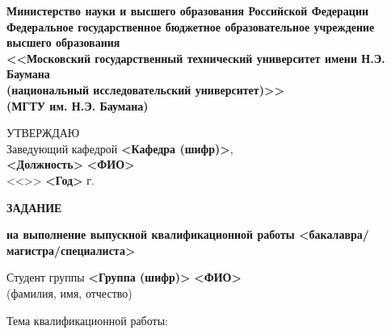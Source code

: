 \documentclass[utf8x, 14pt, oneside, a4paper]{article}
\begin{document}
	\thispagestyle{empty}
	\begin{center}
		\fontsize{12pt}{0.3\baselineskip}\selectfont \textbf{Министерство науки и высшего образования Российской Федерации \\ Федеральное государственное бюджетное образовательное учреждение \\ высшего образования \\ <<Московский государственный технический университет имени Н.Э. Баумана \\ (национальный исследовательский университет)>> \\ (МГТУ им. Н.Э. Баумана)}
		
		\fontsize{12pt}{0.5\baselineskip}\selectfont
		\noindent \makebox[\linewidth]{\rule{\textwidth}{4pt}} \makebox[\linewidth]{\rule{\textwidth}{1pt}}
	\end{center}

	\begin{flushright}
		\fontsize{12pt}{\baselineskip}\selectfont УТВЕРЖДАЮ \\ Заведующий кафедрой \textbf{<Кафедра (шифр)>}, \\ \textbf{<Должность>} \uline{\hspace*{2cm}} \textbf{<ФИО>} \\ <<\uline{\hspace*{1cm}}>> \uline{\hspace*{2.5cm}} \textbf{<Год>} г.
	\end{flushright}

	\vfill

	\begin{center}
		\fontsize{18pt}{\baselineskip}\selectfont \textbf{ЗАДАНИЕ}

		\fontsize{16pt}{\baselineskip}\selectfont \textbf{на выполнение выпускной квалификационной работы <бакалавра/магистра/специалиста>}
	\end{center}

	\normalsize

	\begin{flushleft}
		\fontsize{12pt}{\baselineskip}\selectfont

		Студент группы \textbf{<Группа (шифр)>} \center \textbf{<ФИО>} \\ (фамилия, имя, отчество)
	\end{flushleft}

	\begin{flushleft}
		\fontsize{12pt}{\baselineskip}\selectfont

		Тема квалификационной работы: \uline{\hfill}

		\uline{\hfill}

		\uline{\hfill}

		\uline{\hfill}

		\uline{\hfill}
	\end{flushleft}
\end{document}
